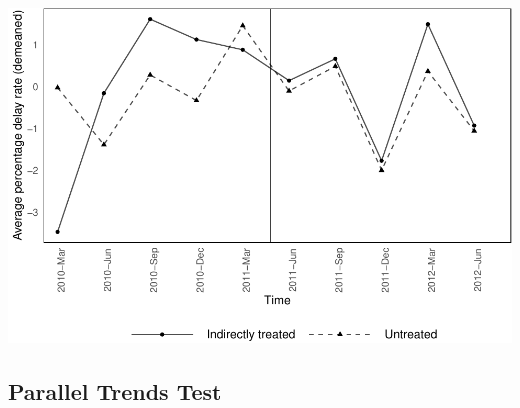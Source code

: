 \documentclass[
]{article}
\begin{document}
\includegraphics{parallel_trends_indirect_treat_files/figure-latex/demeaned_delay_plot-1.pdf}

\hypertarget{parallel-trends-test}{%
\subsection{Parallel Trends Test}\label{parallel-trends-test}}
\end{document}
